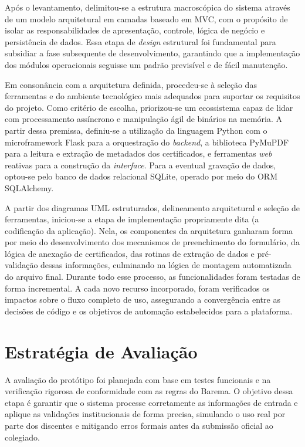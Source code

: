 Após o levantamento, delimitou-se a estrutura macroscópica do sistema através de um modelo arquitetural em camadas baseado em MVC, com o propósito de isolar as responsabilidades de apresentação, controle, lógica de negócio e persistência de dados. Essa etapa de \textit{design} estrutural foi fundamental para subsidiar a fase subsequente de desenvolvimento, garantindo que a implementação dos módulos operacionais seguisse um padrão previsível e de fácil manutenção.

Em consonância com a arquitetura definida, procedeu-se à seleção das ferramentas e do ambiente tecnológico mais adequados para suportar os requisitos do projeto. Como critério de escolha, priorizou-se um ecossistema capaz de lidar com processamento assíncrono e manipulação ágil de binários na memória. A partir dessa premissa, definiu-se a utilização da linguagem Python com o microframework Flask para a orquestração do \textit{backend}, a biblioteca PyMuPDF para a leitura e extração de metadados dos certificados, e ferramentas \textit{web} reativas para a construção da \textit{interface}. Para a eventual gravação de dados, optou-se pelo banco de dados relacional SQLite, operado por meio do ORM SQLAlchemy.


A partir dos diagramas UML estruturados, delineamento arquitetural e seleção de ferramentas, iniciou-se a etapa de implementação propriamente dita (a codificação da aplicação). Nela, os componentes da arquitetura ganharam forma por meio do desenvolvimento dos mecanismos de preenchimento do formulário, da lógica de anexação de certificados, das rotinas de extração de dados e pré-validação dessas informações, culminando na lógica de montagem automatizada do arquivo final. Durante todo esse processo, as funcionalidades foram testadas de forma incremental. A cada novo recurso incorporado, foram verificados os impactos sobre o fluxo completo de uso, assegurando a convergência entre as decisões de código e os objetivos de automação estabelecidos para a plataforma.

\section{Estratégia de Avaliação}\label{sec:estrategia_validacao}

A avaliação do protótipo foi planejada com base em testes funcionais e na verificação rigorosa de conformidade com as regras do Barema. O objetivo dessa etapa é garantir que o sistema processe corretamente as informações de entrada e aplique as validações institucionais de forma precisa, simulando o uso real por parte dos discentes e mitigando erros formais antes da submissão oficial ao colegiado.

